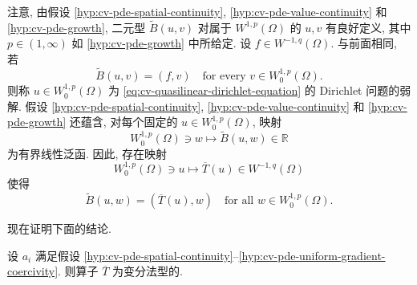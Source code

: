 注意, 由假设 \ref{hyp:cv-pde-spatial-continuity}, \ref{hyp:cv-pde-value-continuity} 和 \ref{hyp:cv-pde-growth}, 二元型 $\widetilde B(u,v)$ 对属于 $W^{1,p}(\Omega)$ 的 $u,v$ 有良好定义, 其中 $p\in(1,\infty)$ 如 \ref{hyp:cv-pde-growth} 中所给定. 设 $f\in W^{-1,q}(\Omega)$. 与前面相同, 若
\begin{equation}\label{eq:cv-quasilinear-dirichlet-weak-solution}
\widetilde B(u,v)=(f,v)\quad\text{for every }v\in W_0^{1,p}(\Omega).
\end{equation}
则称 $u\in W_0^{1,p}(\Omega)$ 为 \eqref{eq:cv-quasilinear-dirichlet-equation} 的 Dirichlet 问题的弱解. 假设 \ref{hyp:cv-pde-spatial-continuity}, \ref{hyp:cv-pde-value-continuity} 和 \ref{hyp:cv-pde-growth} 还蕴含, 对每个固定的 $u\in W_0^{1,p}(\Omega)$, 映射
\begin{equation}\label{eq:cv-quasilinear-bounded-test-functional}
W_0^{1,p}(\Omega)\ni w\mapsto\widetilde B(u,w)\in\mathbb{R}
\end{equation}
为有界线性泛函. 因此, 存在映射
\begin{equation}\label{eq:cv-quasilinear-induced-dual-mapping}
W_0^{1,p}(\Omega)\ni u\mapsto\overline T(u)\in W^{-1,q}(\Omega)
\end{equation}
使得
\begin{equation}\label{eq:cv-quasilinear-induced-pairing}
\widetilde B(u,w)=(\overline T(u),w)\quad\text{for all }w\in W_0^{1,p}(\Omega).
\end{equation}


现在证明下面的结论.

\begin{Theorem}
\label{thm:cv-pde-operator-is-variations-type}
设 $a_i$ 满足假设 \ref{hyp:cv-pde-spatial-continuity}--\ref{hyp:cv-pde-uniform-gradient-coercivity}. 则算子 $\overline T$ 为变分法型的.
\end{Theorem}

